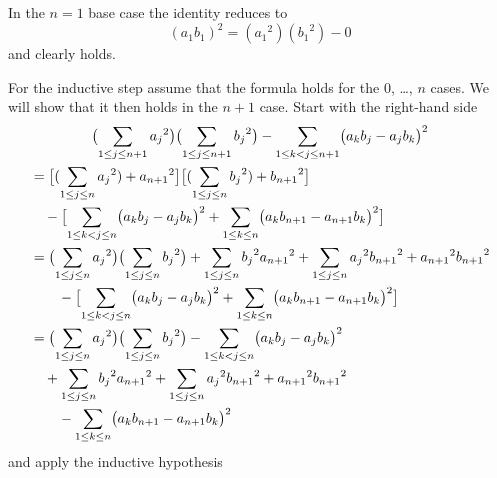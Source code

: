 \begin{exercises}
\begin{answer}
       In the \( n=1 \) base case the identity reduces to
       \begin{equation*}
          (a_1b_1)^2=({a_1}^2)({b_1}^2)-0
       \end{equation*}
       and clearly holds.

       For the inductive step assume that 
       the formula holds for the \( 0 \), \ldots, \( n \) cases.
       We will show that it then holds in the \( n+1 \) case.
       Start with the right-hand side
       \begin{multline*}
         \bigl( \sum_{1\leq j\leq n+1}{a_j}^2\bigr)
         \bigl( \sum_{1\leq j\leq n+1}{b_j}^2\bigr)
         -
         \sum_{1\leq k<j\leq n+1}\bigl(a_kb_j-a_jb_k\bigr)^2  \\
       \begin{aligned}
         &=
         \bigl[ (\sum_{1\leq j\leq n}{a_j}^2)+{a_{n+1}}^2\bigr]
         \bigl[ (\sum_{1\leq j\leq n}{b_j}^2)+{b_{n+1}}^2\bigr]   \\     
         &\hbox{}\quad -
         \bigl[\sum_{1\leq k<j\leq n}\bigl(a_kb_j-a_jb_k\bigr)^2+
         \sum_{1\leq k\leq n}\bigl(a_kb_{n+1}-a_{n+1}b_k\bigr)^2  \bigr] \\
         &=
         \bigl( \sum_{1\leq j\leq n}{a_j}^2\bigr)
         \bigl( \sum_{1\leq j\leq n}{b_j}^2\bigr)
         +
         \sum_{1\leq j\leq n}{b_j}^2{a_{n+1}}^2                 
         +
         \sum_{1\leq j\leq n}{a_j}^2{b_{n+1}}^2
         +
         {a_{n+1}}^2{b_{n+1}}^2                                 \\
         &\hbox{}\qquad\hbox{} -
         \bigl[\sum_{1\leq k<j\leq n}\bigl(a_kb_j-a_jb_k\bigr)^2+
         \sum_{1\leq k\leq n}\bigl(a_kb_{n+1}-a_{n+1}b_k\bigr)^2  \bigr] \\
         &=
         \bigl( \sum_{1\leq j\leq n}{a_j}^2\bigr)
         \bigl( \sum_{1\leq j\leq n}{b_j}^2\bigr)
         -\sum_{1\leq k<j\leq n}\bigl(a_kb_j-a_jb_k\bigr)^2   \\   
         &\hbox{}\quad +
         \sum_{1\leq j\leq n}{b_j}^2{a_{n+1}}^2
         +
         \sum_{1\leq j\leq n}{a_j}^2{b_{n+1}}^2
         +
         {a_{n+1}}^2{b_{n+1}}^2                                 \\
         &\hbox{}\qquad\hbox{} -
         \sum_{1\leq k\leq n}\bigl(a_kb_{n+1}-a_{n+1}b_k\bigr)^2
        \end{aligned}
       \end{multline*}
       and apply the inductive hypothesis
       \begin{align*}

\end{align*}
\end{answer}
\end{exercises}
